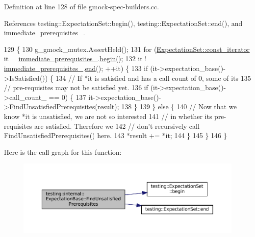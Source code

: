 Definition at line 128 of file gmock-\/spec-\/builders.\+cc.



References testing\+::\+Expectation\+Set\+::begin(), testing\+::\+Expectation\+Set\+::end(), and immediate\+\_\+prerequisites\+\_\+.


\begin{DoxyCode}
129                                                   \{
130   g\_gmock\_mutex.AssertHeld();
131   \textcolor{keywordflow}{for} (\hyperlink{classtesting_1_1ExpectationSet_ab269a45f80d8c4f747b29de454a084bb}{ExpectationSet::const\_iterator} it = 
      \hyperlink{classtesting_1_1internal_1_1ExpectationBase_a186eff0fdcacc8c1e1a2becdec11d3cd}{immediate\_prerequisites\_}.\hyperlink{classtesting_1_1ExpectationSet_ad7b8b900ef3f3e35a5d93aecd452504c}{begin}();
132        it != \hyperlink{classtesting_1_1internal_1_1ExpectationBase_a186eff0fdcacc8c1e1a2becdec11d3cd}{immediate\_prerequisites\_}.\hyperlink{classtesting_1_1ExpectationSet_aac2a004529006c827e4d3420c4d4187a}{end}(); ++it) \{
133     \textcolor{keywordflow}{if} (it->expectation\_base()->IsSatisfied()) \{
134       \textcolor{comment}{// If *it is satisfied and has a call count of 0, some of its}
135       \textcolor{comment}{// pre-requisites may not be satisfied yet.}
136       \textcolor{keywordflow}{if} (it->expectation\_base()->call\_count\_ == 0) \{
137         it->expectation\_base()->FindUnsatisfiedPrerequisites(result);
138       \}
139     \} \textcolor{keywordflow}{else} \{
140       \textcolor{comment}{// Now that we know *it is unsatisfied, we are not so interested}
141       \textcolor{comment}{// in whether its pre-requisites are satisfied.  Therefore we}
142       \textcolor{comment}{// don't recursively call FindUnsatisfiedPrerequisites() here.}
143       *result += *it;
144     \}
145   \}
146 \}
\end{DoxyCode}
Here is the call graph for this function\+:
\nopagebreak
\begin{figure}[H]
\begin{center}
\leavevmode
\includegraphics[width=350pt]{classtesting_1_1internal_1_1ExpectationBase_a9eb518c079f950a59c67e8012d3371c0_cgraph}
\end{center}
\end{figure}
\mbox{\label{classtesting_1_1internal_1_1ExpectationBase_a678f6fc24742ab0236ebc9a8128e7bfe}} 
